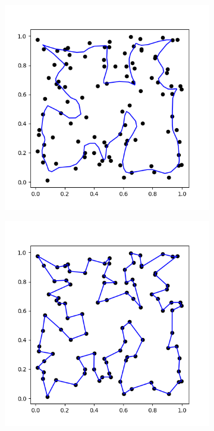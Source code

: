\documentclass{article}
\begin{document}
\begin{figure}[h]
\begin{subfigure}[t]{0.24\linewidth}
		\label{fig:sim2}	
	\end{subfigure}%
	\begin{subfigure}[t]{0.24\linewidth}
		\centering
		\includegraphics[width = 1.0\linewidth, trim={20 20 30 30}, clip=true]{figures/int/optimum_K16_004.png}
		\label{fig:sim3}	
	\end{subfigure}%
	\begin{subfigure}[t]{0.24\linewidth}
		\centering
		\includegraphics[width = 1.0\linewidth, trim={20 20 30 30}, clip=true]{figures/optimum_2.png}

\end{subfigure}
\end{figure}
\end{document}
